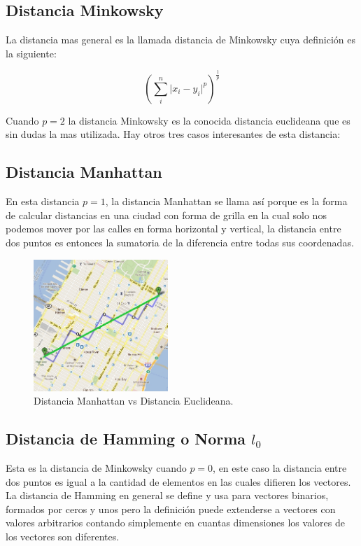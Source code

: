 \subsection{Distancia Minkowsky} La distancia mas general es la llamada distancia de Minkowsky cuya definición es la siguiente:

$$(\sum_{i}^{n}\lvert x_i-y_i  \rvert^p)^{\frac{1}{p}}$$

Cuando $p=2$ la distancia Minkowsky es la conocida distancia euclideana que es sin dudas la mas utilizada. Hay otros tres casos interesantes de esta distancia:

\subsection{Distancia Manhattan} En esta distancia $p=1$, la distancia Manhattan se llama así porque es la forma de calcular distancias en una ciudad con forma de grilla en la cual solo nos podemos mover por las calles en forma horizontal y vertical, la distancia entre dos puntos es entonces la sumatoria de la diferencia entre todas sus coordenadas.

\begin{figure}[!htb]
\centering
\includegraphics[width=2in]{figures/manhattan-fig.png}
\caption{Distancia Manhattan vs Distancia Euclideana.}
\label{fig11}

\end{figure}

\subsection{Distancia de Hamming o Norma $l_0$} Esta es la distancia de Minkowsky cuando $p=0$, en este caso la distancia entre dos puntos es igual a la cantidad de elementos en las cuales difieren los vectores. La distancia de Hamming en general se define y usa para vectores binarios, formados por ceros y unos pero la definición puede extenderse a vectores con valores arbitrarios contando simplemente en cuantas dimensiones los valores de los vectores son diferentes.

